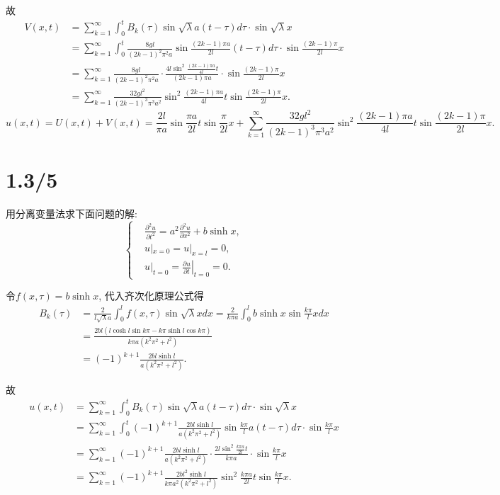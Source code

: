 \documentclass[11pt,a4paper]{article}
\begin{document}
故
\begin{align*}
  V(x,t) & =\sum_{k=1}^\infty\int_0^t B_k(\tau)\sin\sqrt{\lambda}a(t-\tau)d\tau\cdot\sin\sqrt{\lambda}x                                       \\
         & =\sum_{k=1}^\infty\int_0^t \frac{8gl}{(2k-1)^2\pi^2a}\sin\frac{(2k-1)\pi a}{2l}(t-\tau)d\tau\cdot\sin\frac{(2k-1)\pi}{2l}x         \\
         & =\sum_{k=1}^\infty\frac{8gl}{(2k-1)^2\pi^2a}\cdot\frac{4l\sin^2\frac{(2k-1)\pi a}{4l}t}{(2k-1)\pi a}\cdot\sin\frac{(2k-1)\pi}{2l}x \\
         & =\sum_{k=1}^\infty\frac{32gl^2}{(2k-1)^3\pi^3a^2}\sin^2\frac{(2k-1)\pi a}{4l}t\sin\frac{(2k-1)\pi}{2l}x.
\end{align*}
$$u(x,t)=U(x,t)+V(x,t)=\frac{2l}{\pi a}\sin\frac{\pi a}{2l}t\sin\frac{\pi}{2l}x+\sum_{k=1}^\infty\frac{32gl^2}{(2k-1)^3\pi^3a^2}\sin^2\frac{(2k-1)\pi a}{4l}t\sin\frac{(2k-1)\pi}{2l}x.$$

\section{1.3/5}
\begin{problem}
用分离变量法求下面问题的解:
$$
  \left\{\begin{aligned}
     & \frac{\partial^2u}{\partial t^2}=
    a^2\frac{\partial^2u}{\partial x^2}+b\sinh x,                   \\
     & u|_{x=0}=u|_{x=l}=0,                                         \\
     & u|_{t=0}=\left.\frac{\partial u}{\partial t}\right|_{t=0}=0.
  \end{aligned}\right.
$$
\end{problem}

令$f(x,\tau)=b\sinh x$, 代入齐次化原理公式得
\begin{align*}
  B_k(\tau)
   & =\frac{2}{l\sqrt{\lambda}a}\int_0^lf(x,\tau)\sin\sqrt{\lambda}xdx
  =\frac{2}{k\pi a}\int_0^lb\sinh x\sin\frac{k\pi}{l}xdx                       \\
   & =\frac{2bl(l\cosh l\sin k\pi-k\pi\sinh l\cos k\pi)}{k\pi a(k^2\pi^2+l^2)} \\
   & =(-1)^{k+1}\frac{2bl\sinh l}{a(k^2\pi^2+l^2)}.
\end{align*}

故
\begin{align*}
  u(x,t) & =\sum_{k=1}^\infty\int_0^t B_k(\tau)\sin\sqrt{\lambda}a(t-\tau)d\tau\cdot\sin\sqrt{\lambda}x                                          \\
         & =\sum_{k=1}^\infty\int_0^t (-1)^{k+1}\frac{2bl\sinh l}{a(k^2\pi^2+l^2)}\sin\frac{k\pi}{l}a(t-\tau)d\tau\cdot\sin\frac{k\pi}{l}x       \\
         & =\sum_{k=1}^\infty (-1)^{k+1}\frac{2bl\sinh l}{a(k^2\pi^2+l^2)}\cdot\frac{2l\sin^2\frac{k\pi a}{2l}t}{k\pi a}\cdot\sin\frac{k\pi}{l}x \\
         & =\sum_{k=1}^\infty (-1)^{k+1}\frac{2bl^2\sinh l}{k\pi a^2(k^2\pi^2+l^2)}\sin^2\frac{k\pi a}{2l}t\sin\frac{k\pi}{l}x.
\end{align*}
\end{document}
